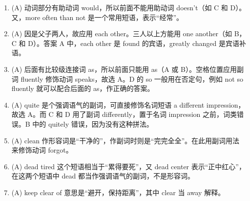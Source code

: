 \begin{enumerate}
\item (A) 动词部分有助动词 would，所以前面不能用助动词 doesn't（如 C 和 D）。又，more often than not 是一个常用短语，表示“经常”。
\item (A) 因是父子两人，故应用 each other。三人以上方能用 one another（如 B，C
  和 D）。答案 A 中，each other 是 found 的宾语，greatly changed 是宾语补语。
\item (A) 后面有比较级连接词 as，所以前面只能用 as（A 或 B）。空格位置应用副
  词 fluently 修饰动词 speaks，故选 A。D 的 so 一般用在否定句，例如 not so fluently 就可以配合后面的 as，作正确的答案。
\item (A) quite 是个强调语气的副词，可直接修饰名词短语 a different impression，故选 A。而 C 和 D 用了副词 differently，置于名词 impression 之前，词类错误。B 中的 quitely 错误，因为没有这种拼法。
\item (A) clean 作形容词是“干净的”，作副词时则是“完完全全”。在此用副词用法来修饰动词 forgot。
\item (A) dead tired 这个短语相当于“累得要死”，又 dead center 表示“正中红心”，在这两个短语中 dead 都当作强调语气的副词，不是形容词。
\item (A) keep clear of 意思是“避开，保持距离”，其中 clear 当 away 解释。


\end{enumerate}
